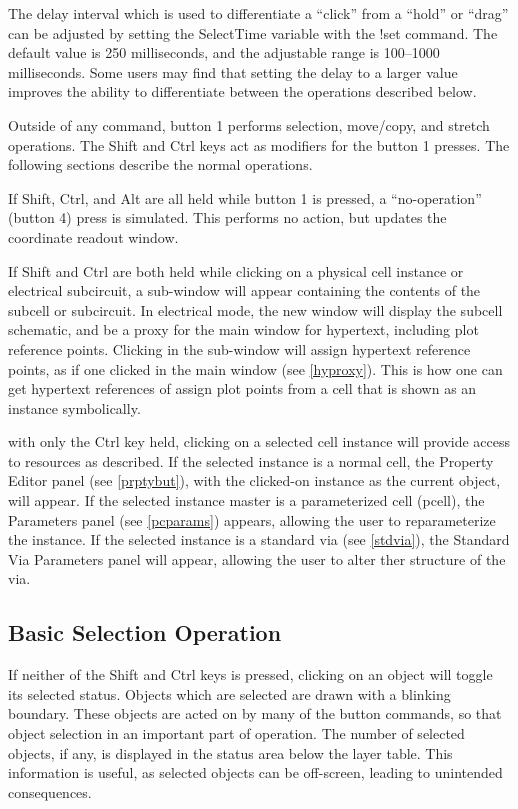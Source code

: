 The delay interval which is used to differentiate a ``click'' from a
``hold'' or ``drag'' can be adjusted by setting the {\cb SelectTime}
variable with the {\cb !set} command.  The default value is 250
milliseconds, and the adjustable range is 100--1000 milliseconds. 
Some users may find that setting the delay to a larger value improves
the ability to differentiate between the operations described below.

Outside of any command, button 1 performs selection, move/copy, and
stretch operations.  The {\kb Shift} and {\kb Ctrl} keys act as
modifiers for the button 1 presses.  The following sections describe
the normal operations.

If {\kb Shift}, {\kb Ctrl}, and {\kb Alt} are all held while button 1
is pressed, a ``no-operation'' (button 4) press is simulated.  This
performs no action, but updates the coordinate readout window.

If {\kb Shift} and {\kb Ctrl} are both held while clicking on a
physical cell instance or electrical subcircuit, a sub-window will
appear containing the contents of the subcell or subcircuit.  In
electrical mode, the new window will display the subcell schematic,
and be a proxy for the main window for hypertext, including plot
reference points.  Clicking in the sub-window will assign hypertext
reference points, as if one clicked in the main window (see
\ref{hyproxy}).  This is how one can get hypertext references of
assign plot points from a cell that is shown as an instance
symbolically.

with only the {\kb Ctrl} key held, clicking on a selected cell
instance will provide access to resources as described.  If the
selected instance is a normal cell, the {\cb Property Editor} panel
(see \ref{prptybut}), with the clicked-on instance as the current
object, will appear.  If the selected instance master is a
parameterized cell (pcell), the {\cb Parameters} panel (see
\ref{pcparams}) appears, allowing the user to reparameterize the
instance.  If the selected instance is a standard via (see
\ref{stdvia}), the {\cb Standard Via Parameters} panel will appear,
allowing the user to alter ther structure of the via.

\subsection{Basic Selection Operation}
\label{btnsel}

If neither of the {\kb Shift} and {\kb Ctrl} keys is pressed, clicking
on an object will toggle its selected status.  Objects which are
selected are drawn with a blinking boundary.  These objects are acted
on by many of the button commands, so that object selection in an
important part of {\Xic} operation.  The number of selected objects,
if any, is displayed in the status area below the layer table.  This
information is useful, as selected objects can be off-screen, leading
to unintended consequences.

